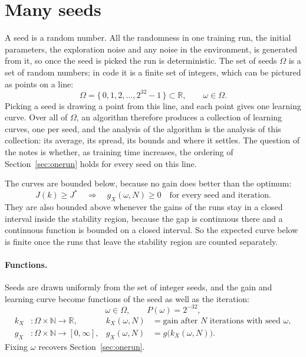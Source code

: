 \documentclass[11pt]{article}
\begin{document}
\section{Many seeds}
\label{sec:seeds}

A seed is a random number. All the randomness in one training run, the initial parameters, the
exploration noise and any noise in the environment, is generated from it, so once the seed is picked
the run is deterministic. The set of seeds $\Omega$ is a set of random numbers; in code it is a
finite set of integers, which can be pictured as points on a line:
\[
  \Omega = \{\, 0, 1, 2, \dots, 2^{32} - 1 \,\} \subset \mathbb{R}, \qquad \omega \in \Omega .
\]
Picking a seed is drawing a point from this line, and each point gives one learning curve. Over all
of $\Omega$, an algorithm therefore produces a collection of learning curves, one per seed, and the
analysis of the algorithm is the analysis of this collection: its average, its spread, its bounds and
where it settles. The question of the notes is whether, as training time increases, the ordering of
Section~\ref{sec:onerun} holds for every seed on this line.

The curves are bounded below, because no gain does better than the optimum:
\[
  J(k) \ge J^* \quad\Longrightarrow\quad g_X(\omega, N) \ge 0 \quad \text{for every seed and iteration} .
\]
They are also bounded above whenever the gains of the runs stay in a closed interval inside the
stability region, because the gap is continuous there and a continuous function is bounded on a
closed interval. So the expected curve below is finite once the runs that leave the stability region
are counted separately.

\paragraph{Functions.} Seeds are drawn uniformly from the set of integer seeds, and the gain and
learning curve become functions of the seed as well as the iteration:
\[
  \omega \in \Omega, \qquad P(\omega) = 2^{-32},
\]
\begin{align*}
  k_X &: \Omega \times \mathbb{N} \to \mathbb{R}, &
    k_X(\omega, N) &= \text{gain after } N \text{ iterations with seed } \omega, \\
  g_X &: \Omega \times \mathbb{N} \to [0, \infty], &
    g_X(\omega, N) &= g\big(k_X(\omega, N)\big).
\end{align*}
Fixing $\omega$ recovers Section~\ref{sec:onerun}.
\end{document}
